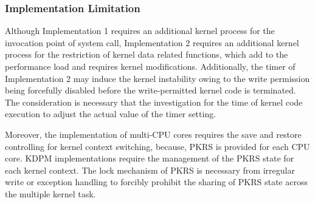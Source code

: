 
\subsubsection{Implementation Limitation}
Although Implementation 1 requires an additional kernel process for the
invocation point of system call,
%
Implementation 2 requires an additional kernel process for the restriction of
kernel data related functions, which add to the performance load and requires
kernel modifications. 
%
Additionally, the timer of Implementation 2 may induce the kernel instability
owing to the write permission being forcefully disabled before the
write-permitted kernel code is terminated. 
The consideration is necessary that the investigation for the time of kernel
code execution to adjust the actual value of the timer setting.
%

Moreover, the implementation of multi-CPU cores requires the save and restore
controlling for kernel context switching, because, PKRS is provided for each CPU
core. KDPM implementations require the management of the PKRS state for each
kernel context. 
%
The lock mechanism of PKRS is necessary from irregular write or exception
handling to forcibly prohibit the sharing of PKRS state across the multiple
kernel task.



